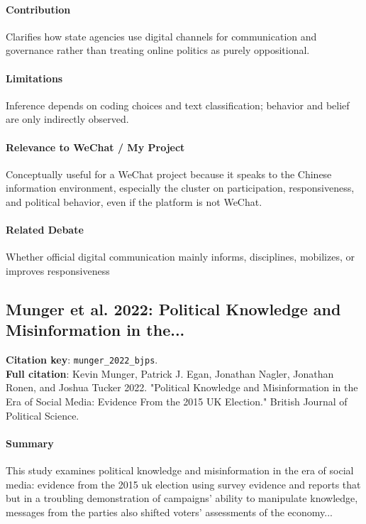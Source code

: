 \documentclass[12pt]{article}
\begin{document}
\paragraph{Contribution} Clarifies how state agencies use digital channels for communication and governance rather than treating online politics as purely oppositional.

\paragraph{Limitations} Inference depends on coding choices and text classification; behavior and belief are only indirectly observed.

\paragraph{Relevance to WeChat / My Project} Conceptually useful for a WeChat project because it speaks to the Chinese information environment, especially the cluster on participation, responsiveness, and political behavior, even if the platform is not WeChat.

\paragraph{Related Debate} Whether official digital communication mainly informs, disciplines, mobilizes, or improves responsiveness


\subsection{Munger et al. 2022: Political Knowledge and Misinformation in the...}
\textbf{Citation key}: \texttt{munger\_2022\_bjps}.\\
\textbf{Full citation}: Kevin Munger, Patrick J. Egan, Jonathan Nagler, Jonathan Ronen, and Joshua Tucker 2022. "Political Knowledge and Misinformation in the Era of Social Media: Evidence From the 2015 UK Election." British Journal of Political Science.

\paragraph{Summary} This study examines political knowledge and misinformation in the era of social media: evidence from the 2015 uk election using survey evidence and reports that but in a troubling demonstration of campaigns' ability to manipulate knowledge, messages from the parties also shifted voters' assessments of the economy...
\end{document}
